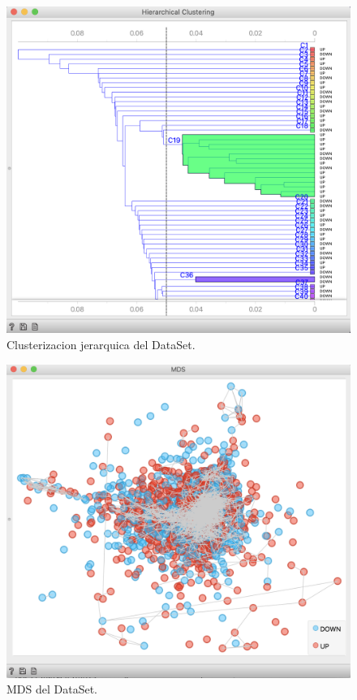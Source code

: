 \documentclass[runningheads]{llncs}
\begin{document}
\begin{figure}[H]
    \center
    \includegraphics[width=1\linewidth]{resources/HierarchicalClustering.png}
    \caption{ Clusterizacion jerarquica del DataSet.}
    \label{fig:3}
\end{figure}
\begin{figure}[H]
    \includegraphics[width=1\linewidth]{resources/MDS.png}
    \caption{ MDS del DataSet.}
    \label{fig:4}
\end{figure}
\end{document}
